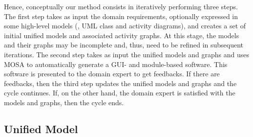 Hence, conceptually our method consists in iteratively performing three steps. The first step takes as input the domain requirements, optionally expressed in some high-level models (\eg, UML class and activity diagrams), and creates a set of initial unified models and associated activity graphs. At this stage, the models and their graphs may be incomplete and, thus, need to be refined in subsequent iterations. The second step takes as input the unified models and graphs and uses MOSA to automatically generate a GUI- and module-based software. This software is presented to the domain expert to get feedbacks. If there are feedbacks, then the third step updates the unified models and graphs and the cycle continues. If, on the other hand, the domain expert is satisfied with the models and graphs, then the cycle ends.

\subsection{Unified Model}

